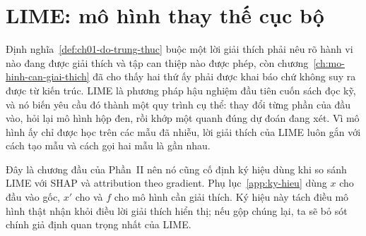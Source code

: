 \chapter{LIME: mô hình thay thế cục bộ}
\label{ch:lime}

Định nghĩa~\ref{def:ch01-do-trung-thuc} buộc một lời giải thích phải nêu rõ
hành vi nào đang được giải thích và tập can thiệp nào được phép, còn
chương~\ref{ch:mo-hinh-can-giai-thich} đã cho thấy hai thứ ấy phải được khai
báo chứ không suy ra được từ kiến trúc. LIME là phương pháp hậu nghiệm đầu tiên cuốn sách đọc kỹ, và nó biến yêu cầu
đó thành một quy trình cụ thể: thay đổi từng phần của đầu vào,
hỏi lại mô hình hộp đen, rồi khớp một  quanh đúng dự đoán
đang xét.
Vì mô hình ấy chỉ được học trên các mẫu đã nhiễu, lời giải thích của LIME luôn
gắn với cách tạo mẫu và cách gọi hai mẫu là gần nhau.

Đây là chương đầu của Phần~II nên nó cũng cố định ký hiệu dùng khi so sánh
LIME với SHAP và attribution theo gradient. Phụ lục~\ref{app:ky-hieu} dùng
$x$ cho đầu vào gốc, $x'$ cho 
và $f$ cho mô hình cần
giải thích. Ký hiệu này tách điều mô hình thật nhận khỏi điều lời giải thích
hiển thị; nếu gộp chúng lại, ta sẽ bỏ sót chính giả định quan trọng nhất của
LIME.









